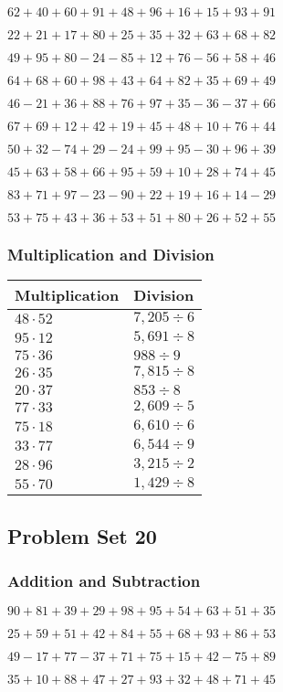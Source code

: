 \(62+40+60+91+48+96+16+15+93+ 91\)

\(22+21+17+80+25+35+32+63+68+82\)

\(49+95+80-24-85+12+76-56+58+46\)

\(64+68+60+98+43+64+82+35+69+49\)

\(46-21+36+88+76+97+35-36-37+66\)

\(67+69+12+42+19+45+48+10+76+44\)

\(50+32-74+29-24+99+95-30+96+39\)

\(45+63+58+66+95+59+10+28+74+45\)

\(83+71+97-23-90+22+19+16+14-29\)

\(53+75+43+36+53+51+80+26+52+55\)

\hypertarget{multiplication-and-division-59}{%
\subsubsection{Multiplication and
Division}\label{multiplication-and-division-59}}

\begin{longtable}[]{@{}ll@{}}
\toprule
Multiplication & Division\tabularnewline
\midrule
\endhead
\(48\cdot52\) & \(7,205÷6\)\tabularnewline
\(95\cdot12\) & \(5,691÷8\)\tabularnewline
\(75\cdot36\) & \(988÷9\)\tabularnewline
\(26\cdot35\) & \(7,815÷8\)\tabularnewline
\(20\cdot37\) & \(853÷8\)\tabularnewline
\(77\cdot33\) & \(2,609÷5\)\tabularnewline
\(75\cdot18\) & \(6,610÷6\)\tabularnewline
\(33\cdot77\) & \(6,544÷9\)\tabularnewline
\(28\cdot96\) & \(3,215÷2\)\tabularnewline
\(55\cdot70\) & \(1,429÷8\)\tabularnewline
\bottomrule
\end{longtable}

\hypertarget{problem-set-20-1}{%
\subsection{Problem Set 20}\label{problem-set-20-1}}

\hypertarget{addition-and-subtraction-60}{%
\subsubsection{Addition and
Subtraction}\label{addition-and-subtraction-60}}

\(90+81+39+29+98+95+54+63+51+ 35\)

\(25+59+51+42+84+55+68+93+86+53\)

\(49-17+77-37+71+75+15+42-75+89\)

\(35+10+88+47+27+93+32+48+71+45\)

